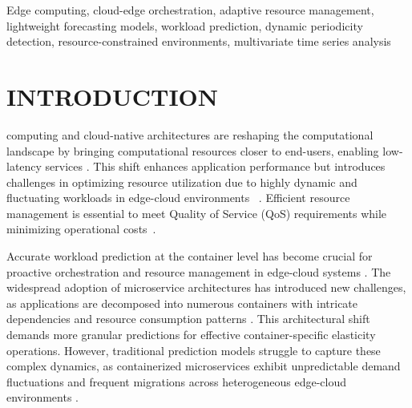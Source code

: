 \documentclass{ieeetmlcn}
\begin{document}
\begin{IEEEkeywords}
Edge computing, cloud-edge orchestration, adaptive resource management, lightweight forecasting models, workload prediction, dynamic periodicity detection, resource-constrained environments, multivariate time series analysis
\end{IEEEkeywords}


\maketitle

\section{INTRODUCTION}
\label{sec:introduction}

 computing and cloud-native architectures are reshaping the computational landscape by bringing computational resources closer to end-users, enabling low-latency services \cite{10229034}. This shift enhances application performance but introduces challenges in optimizing resource utilization due to highly dynamic and fluctuating workloads in edge-cloud environments ~\cite{10229064, 8258257}. Efficient resource management is essential to meet Quality of Service (QoS) requirements while minimizing operational costs~\cite{8258257}.

Accurate workload prediction at the container level has become crucial for proactive orchestration and resource management in edge-cloud systems \cite{9068614}. The widespread adoption of microservice architectures has introduced new challenges, as applications are decomposed into numerous containers with intricate dependencies and resource consumption patterns \cite{10029931}. This architectural shift demands more granular predictions for effective container-specific elasticity operations. However, traditional prediction models struggle to capture these complex dynamics, as containerized microservices exhibit unpredictable demand fluctuations and frequent migrations across heterogeneous edge-cloud environments \cite{ouyang2023dynamic, benidis2022deep}.
\end{document}
